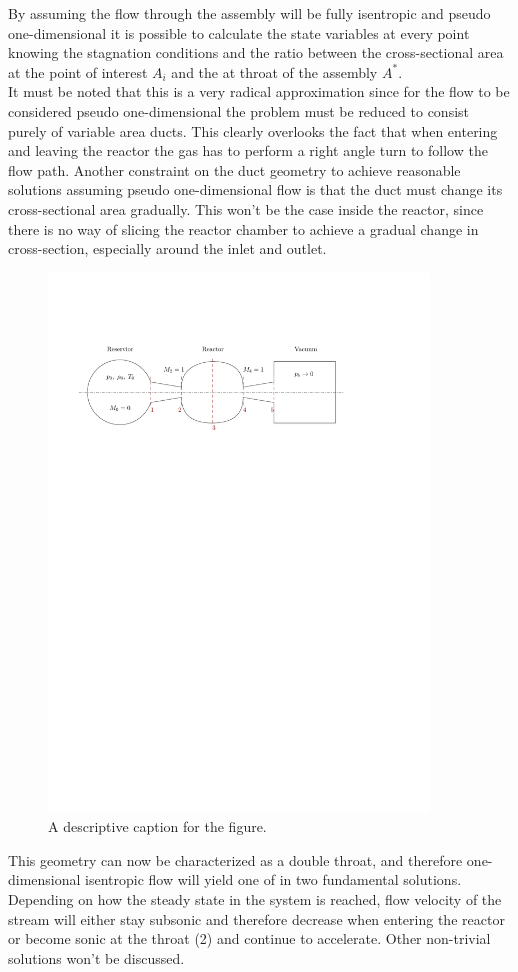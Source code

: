 	By assuming the flow through the assembly will be fully isentropic and pseudo one-dimensional it is possible to calculate the state variables at every point knowing the stagnation conditions and the ratio between the cross-sectional area at the point of interest $A_i$ and the at throat of the assembly $A^*$.\\
	It must be noted that this is a very radical approximation since for the flow to be  considered pseudo one-dimensional the problem must be reduced to consist purely of variable area ducts.
	This clearly overlooks the fact that when entering and leaving the reactor the gas has to perform a right angle turn to follow the flow path.
	Another constraint on the duct geometry to achieve reasonable solutions assuming pseudo one-dimensional flow is that the duct must change its cross-sectional area gradually.
	\cite{anderson2021modern}
	This won't be the case inside the reactor, since there is no way of slicing the reactor chamber to achieve a gradual change in cross-section, especially around the inlet and outlet.
	\begin{figure}[H]
	    \centering
	    \includegraphics[width=0.9\textwidth]{src/03_analytical-work/fig_1d-flow-geometry}
	    \caption{A descriptive caption for the figure.}
	\end{figure}
	This geometry can now be characterized as a double throat, and therefore one-dimensional isentropic flow will yield one of in two fundamental solutions.
	Depending on how the steady state in the system is reached, flow velocity of the stream will either stay subsonic and therefore decrease when entering the reactor or become sonic at the throat (2) and continue to accelerate.
	Other non-trivial solutions won't be discussed.
	\cite{SALAS1986193, EMMONS1958}

